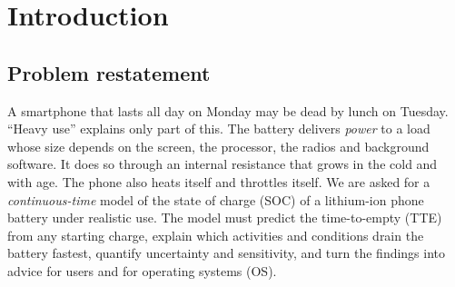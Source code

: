 \section{Introduction}\label{sec:intro}

\subsection{Problem restatement}
A smartphone that lasts all day on Monday may be dead by lunch on Tuesday. ``Heavy use'' explains only part of
this. The battery delivers \emph{power} to a load whose size depends on the screen, the processor, the radios and
background software. It does so through an internal resistance that grows in the cold and with age. The phone also
heats itself and throttles itself. We are asked for a \emph{continuous-time} model of the state of charge (SOC)
of a lithium-ion phone battery under realistic use. The model must predict the time-to-empty (TTE) from any
starting charge, explain which activities and conditions drain the battery fastest, quantify uncertainty and
sensitivity, and turn the findings into advice for users and for operating systems (OS).

